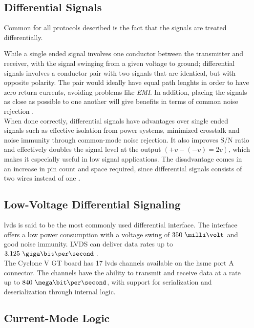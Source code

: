 \documentclass[main.tex]{subfiles}
\begin{document}
\subsection{Differential Signals} \label{subsec:diffsig}

Common for all protocols described is the fact that the signals are treated differentially. 

While a single ended signal involves one conductor between the transmitter and receiver, with the signal swinging from a given voltage to ground; differential signals involves a conductor pair with two signals that are identical, but with opposite polarity. The pair would ideally have equal path lenghts in order to have zero return currents, avoiding problems like \textit{EMI}. In addition, placing the signals as close as possible to one another will give benefits in terms of common noise rejection \cite{douglas01}.\\

When done correctly, differential signals have advantages over single ended signals such as effective isolation from power systems, minimized crosstalk and noise immunity through common-mode noise rejection. It also improves S/N ratio and effectively doubles the signal level at the output $(+v - (-v) = 2v)$, which makes it especially useful in low signal applications. The disadvantage comes in an increase in pin count and space required, since differential signals consists of two wires instead of one \cite{douglas01}.

\subsection{Low-Voltage Differential Signaling}

\gls{lvds} is said to be the most commonly used differential interface. The interface offers a low power consumption with a voltage swing of $350\ \milli\volt$ and good noise immunity. LVDS can deliver data rates up to $3.125\ \giga\bit\per\second$ \cite{ti08lvds}.\\

The Cyclone V GT board has 17 \gls{lvds} channels available on the \gls{hsmc} port A connector. The channels have the ability to transmit and receive data at a rate up to $840\ \mega\bit\per\second$, with support for serialization and deserialization through internal logic. \cite{altera_cvoverview15}

\subsection{Current-Mode Logic}
\end{document}
